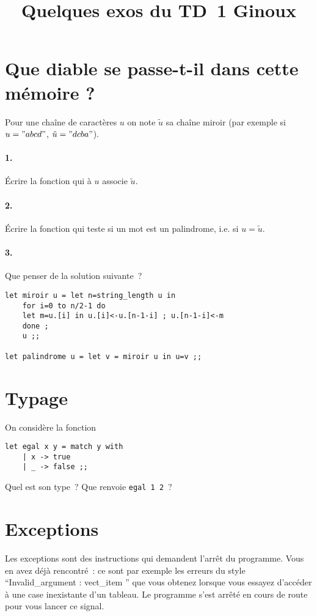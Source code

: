 \documentclass[10pt,a4paper]{article}
\begin{document}
\title{Quelques exos du TD 1 Ginoux}
\maketitle{}

\section{Que diable se passe-t-il dans cette mémoire ?}
Pour une chaîne de caractères $u$ on note $\tilde{u}$ sa chaîne miroir (par exemple si $u = "abcd"$, $\tilde{u} = "dcba"$).

\paragraph{1.} Écrire la fonction qui à $u$ associe $\tilde{u}$.

\paragraph{2.} Écrire la fonction qui teste si un mot est un palindrome, i.e. si $u = \tilde{u}$.

\paragraph{3.} Que penser de la solution suivante~?
\begin{verbatim}let miroir u = let n=string_length u in
    for i=0 to n/2-1 do
    let m=u.[i] in u.[i]<-u.[n-1-i] ; u.[n-1-i]<-m
    done ;
    u ;;
    
let palindrome u = let v = miroir u in u=v ;;    
\end{verbatim}

\section{Typage}
On considère la fonction
\begin{verbatim}let egal x y = match y with
    | x -> true
    | _ -> false ;;
\end{verbatim}
Quel est son type~? Que renvoie \texttt{egal 1 2}~?

\section{Exceptions}
Les exceptions sont des instructions qui demandent l'arrêt du programme. Vous en avez déjà rencontré~: ce sont par exemple les erreurs du style ``Invalid\_argument : vect\_item '' que vous obtenez lorsque vous essayez d'accéder à une case inexistante d'un tableau. Le programme s'est arrêté en cours de route pour vous lancer ce signal.
\end{document}
